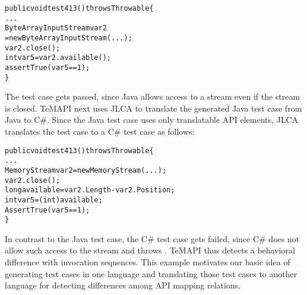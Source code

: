 \begin{CodeOut}%
\begin{alltt}
public void test413() throws Throwable \{
  ...
  ByteArrayInputStream var2
       = new ByteArrayInputStream(...);
  var2.close();
  int var5 = var2.available();
  assertTrue(var5 == 1);
\}
\end{alltt}
\end{CodeOut}%


The test case gets passed, since Java allows access to a stream even if the stream is closed. TeMAPI next uses JLCA to translate the generated Java test case from Java to C\#. Since the Java test case uses only translatable API elements, JLCA translates the test case to a C\# test case as follows:

\begin{CodeOut}%
\begin{alltt}
public void test413() throws Throwable\{
  ...
  MemoryStream var2 = new MemoryStream(...);
  var2.close();
  long available = var2.Length - var2.Position;
  int var5 = (int) available;
  AssertTrue(var5 == 1);
\}
\end{alltt}
\end{CodeOut}%

In contrast to the Java test case, the C\# test case gets failed, since C\# does not allow such access to the stream and throws . TeMAPI thus detects a behavioral difference with invocation sequences. This example motivates our basic idea of generating test cases in one language and translating those test cases to another language for detecting differences among API mapping relations. %


